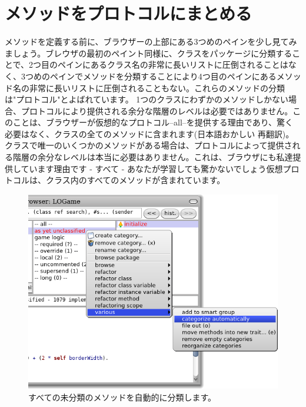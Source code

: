 \documentclass[a4paper,10pt,twoside]{book}
\begin{document}

\section{メソッドをプロトコルにまとめる}

メソッドを定義する前に、ブラウザーの上部にある3つめのペインを少し見てみましょう。ブレウザの最初のペイント同様に、クラスをパッケージに分類することで、2つ目のペインにあるクラス名の非常に長いリストに圧倒されることはなく、3つめのペインでメソッドを分類することにより4つ目のペインにあるメソッド名の非常に長いリストに圧倒されることもない。これらのメソッドの分類は"プロトコル"とよばれています。
1つのクラスにわずかのメソッドしかない場合、プロトコルにより提供される余分な階層のレベルは必要ではありません。このことは、ブラウザーが仮想的なプロトコル--all--を提供する理由であり、驚く必要はなく、クラスの全てのメソッドに含まれます(日本語おかしい 再翻訳)。
クラスで唯一のいくつかのメソッドがある場合は、プロトコルによって提供される階層の余分なレベルは本当に必要はありません。これは、ブラウザにも私達提供しています理由です - すべて - あなたが学習しても驚かないでしょう仮想プロトコルは、クラス内のすべてのメソッドが含まれています。

\begin{figure}[htbp]
   \centering
   \includegraphics[width=\textwidth]{Categorize} 
   \caption{すべての未分類のメソッドを自動的に分類します。}
\end{figure}
\end{document}

